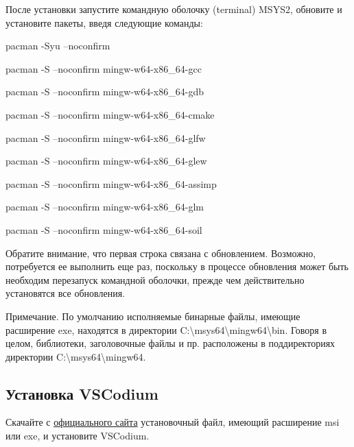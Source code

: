 \documentclass[a4paper,12pt]{article}
\renewenvironment{itemize}{
    \begin{list}{\labelitemi}{
    \setlength{\topsep}{0pt}
    \setlength{\partopsep}{6pt}
    \setlength{\parskip}{0pt}
    \setlength{\itemsep}{0pt}
    \setlength{\parsep}{0pt}
    }
}{\end{list}}
\begin{document}
        После установки запустите командную оболочку (terminal) MSYS2, обновите и установите пакеты, введя следующие команды:
        
        \begin{itemize}
            \item[] pacman -Syu --noconfirm
            \item[] pacman -S --noconfirm mingw-w64-x86\_64-gcc
            \item[] pacman -S --noconfirm mingw-w64-x86\_64-gdb
            \item[] pacman -S --noconfirm mingw-w64-x86\_64-cmake
            \item[] pacman -S --noconfirm mingw-w64-x86\_64-glfw
            \item[] pacman -S --noconfirm mingw-w64-x86\_64-glew
            \item[] pacman -S --noconfirm mingw-w64-x86\_64-assimp
            \item[] pacman -S --noconfirm mingw-w64-x86\_64-glm
            \item[] pacman -S --noconfirm mingw-w64-x86\_64-soil

        \end{itemize}
                
        Обратите внимание, что первая строка связана с обновлением. Возможно, потребуется ее выполнить еще раз, поскольку в процессе обновления может быть необходим перезапуск командной оболочки, прежде чем действительно установятся все обновления.



        Примечание. 
        По умолчанию исполняемые бинарные файлы, имеющие расширение exe, находятся в директории \textquotedbl C:\textbackslash msys64\textbackslash mingw64\textbackslash bin\textquotedbl. Говоря в целом, библиотеки, заголовочные файлы и пр. расположены в поддиректориях директории \textquotedbl C:\textbackslash msys64\textbackslash mingw64\textquotedbl.

        \subsection{Установка VSCodium}
        
        Скачайте с \href{https://github.com/VSCodium/vscodium/releases/}{официального сайта} установочный файл, имеющий расширение msi или exe, и установите VSCodium.
\end{document}
